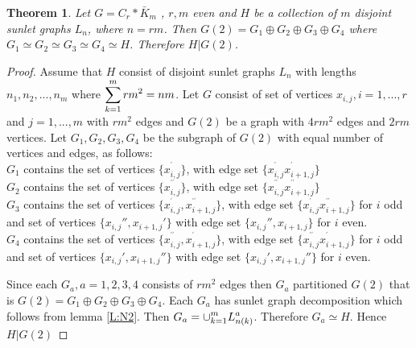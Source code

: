 \documentclass[12pt]{report}
\newtheorem{thm}{Theorem}[section]
\newtheorem{cor}[thm]{Corollary}
\begin{document}
\begin{thm}\label{T:N8}
Let $G=C_{r}*\bar{K}_{m}$ , $r,m$ even and $H$ be a collection of
$m$ disjoint sunlet graphs $L_{n}$, where $n=rm$. Then $G\left(
2\right) =G_{1}\oplus G_{2}\oplus G_{3}\oplus G_{4}$ where
$G_{1}\simeq G_{2}\simeq G_{3}\simeq G_{4}\simeq H$. Therefore
$H|G\left( 2\right) $.
\end{thm}
\begin{proof}
Assume that $H$ consist of disjoint sunlet graphs $L_{n}$ with lengths $%
n_{1},n_{2},...,n_{m}$ where $\displaystyle\sum_{k=1}^{m}rm^{2}=nm$. Let $G$
consist of set of vertices $x_{i,j},i=1,...,r$ and $j=1,...,m$ with
$rm^2$ edges and
$G\left( 2\right) $ be a graph with $4rm^{2}$ edges and $2rm$ vertices. Let $%
G_{1},G_{2},G_{3},G_{4}$ be the subgraph of $G\left( 2\right) $ with
equal
number of vertices and edges, as follows:\\
$G_{1}$ contains the set of vertices $\{x_{i,j}^{^{\prime }}\}$,
with edge set
$\{x_{i,j}^{^{\prime }}x_{i+1,j}^{^{\prime }}\}$\\
$G_{2}$ contains the set of vertices $\{x_{i,j}^{^{\prime \prime
}}\}$, with
edge set $\{x_{i,j}^{^{\prime \prime }}x_{i+1,j}^{^{\prime \prime }}\}$\\
$G_{3}$ contains the set of vertices $\{x_{i,j}^{^{\prime
}},x_{i+1,j}^{^{\prime \prime }}\}$, with edge set
$\{x_{i,j}^{^{\prime
}}x_{i+1,j}^{^{\prime \prime }}\}$ for $i$ odd and set of vertices $\{x_{i,j}'',x_{i+1,j}'\}$ with edge set $\{x_{i,j}'',x_{i+1,j}\}$ for $i$ even.\\
$G_{4}$ contains the set of vertices $\{x_{i,j}^{^{\prime \prime
}},x_{i+1,j}^{^{\prime }}\}$, with edge set $\{x_{i,j}^{^{\prime
\prime }}x_{i+1,j}^{^{\prime }}\}$ for $i$ odd and set of vertices
$\{x_{i,j}',x_{i+1,j}''\}$ with edge set $\{x_{i,j}',x_{i+1,j}''\}$
for $i$ even.

Since each $G_{a},a=1,2,3,4$ consists of $rm^{2}$ edges then $G_{a}$
partitioned  $G\left( 2\right) $ that is $G\left( 2\right)
=G_{1}\oplus G_{2}\oplus G_{3}\oplus G_{4}$. Each $G_{a}$ has sunlet
graph
decomposition which follows from lemma \ref{L:N2}. Then $G_{a}=%
\disp\cup_{k=1}^{m}L_{n(k)}^{a}$. Therefore $G_{a}\simeq H $. Hence
$H|G\left( 2\right) $
\end{proof}
\end{document}
